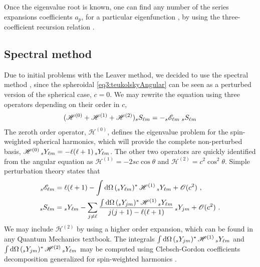 Once the eigenvalue root is known, one can find any number of the series expansions coefficients $a_p$, for a particular eigenfunction , by using the three-coefficient recursion relation .


\subsection{Spectral method}

Due to initial problems with the Leaver method, we decided to use the spectral method \cite{Cook2014},
since the spheroidal \eqref{eq3:teukolskyAngular} can be seen as a perturbed version of the spherical case, $c=0$.
We may rewrite the equation using three operators depending on their order in $c$, 
\begin{align}
	\label{eq4:angularEqH012}
	( \mathscr{H}^{(0)} +  \mathscr{H}^{(1)} + \mathscr{H}^{(2)} ) \uu[s]{S}{\ell m} = - \uu[s]{\mathscr{E}}{\ell m}  \;\uu[s]{S}{\ell m} 
\end{align}
The zeroth order operator, $\mathscr{H}^{(0)}$, defines the eigenvalue problem for the spin-weighted spherical harmonics, which will provide the complete non-perturbed basis, $\mathscr{H}^{(0)} \,\uu[s]{Y}{\ell m} = -\ell(\ell+1) \,\uu[s]{Y}{\ell m}$.
The other two operators are quickly identified from the angular equation as $\mathscr{H}^{(1)} = - 2 s c \cos\theta$ and $\mathscr{H}^{(2)} = c^2 \cos^2\theta$.
Simple perturbation theory \cite{TeukolskyPress1973b} states that
\begin{align}
	\begin{split}
		\uu[s]{\mathscr{E}}{\ell m} &= \ell(\ell+1) - \int \dd\Omega \,(\uu[s]{Y}{\ell m})^* \,\mathscr{H}^{(1)} \,\uu[s]{Y}{\ell m} + \mathscr{O}(c^2) ~, \\
		\uu[s]{S}{\ell m} &= \uu[s]{Y}{\ell m} - \sum_{j\ne\ell} \frac{\int \dd\Omega \,(\uu[s]{Y}{j m})^* \,\mathscr{H}^{(1)} \,\uu[s]{Y}{\ell m}}{j(j+1)-\ell(\ell+1)} \, \uu[s]{Y}{j m} +\mathscr{O}(c^2) ~.
	\end{split}
\end{align}
We may include $\mathscr{H}^{(2)}$ by using a higher order expansion, which can be found in any Quantum Mechanics textbook.
The integrals $\int \dd\Omega \,(\uu[s]{Y}{j m})^* \,\mathscr{H}^{(1)} \,\uu[s]{Y}{\ell m}$ and $\int \dd\Omega \,(\uu[s]{Y}{j m})^* \,\mathscr{H}^{(2)} \,\uu[s]{Y}{\ell m}$ may be computed using Clebsch-Gordon coefficients decomposition generalized for spin-weighted harmonics .
